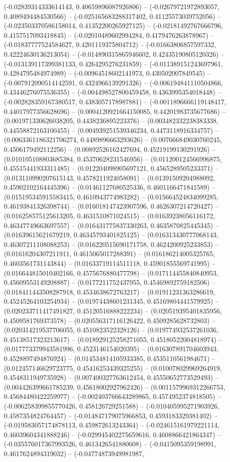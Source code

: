 (-0.02839314333614143, 0.40659896087926806) -- (-0.02679721972893057, 0.4089494484530566) -- (-0.025165683288317402, 0.41125573039752056) -- (-0.023503370586158014, 0.41352200265927125) -- (-0.02181492767666796, 0.4157517093418845) -- (-0.02010489602994284, 0.4179476263878967) -- (-0.01837777524584627, 0.4201119375804712) -- (-0.01663806857597332, 0.42224630136213054) -- (-0.014890315865946602, 0.42435190805120326) -- (-0.013139117399381133, 0.4264295276231859) -- (-0.011389151243697961, 0.4284795484974989) -- (-0.00964518602141973, 0.430502007849545) -- (-0.007912090514142591, 0.4324966139291326) -- (-0.006194841110504866, 0.43446276075536355) -- (-0.004498527800459458, 0.4363995354018448) -- (-0.002828359167380517, 0.4383057178987881) -- (-0.0011896666119148417, 0.44017977356628696) -- (0.0004120921664150085, 0.44201983735677686) -- (0.001971330626038205, 0.4438236895223376) -- (0.003482332238383338, 0.44558872163100455) -- (0.004939251539346234, 0.4473118916334757) -- (0.0063361186321706274, 0.4489896663293626) -- (0.007666849030760245, 0.4506179492112256) -- (0.00892526162427694, 0.45219199130291926) -- (0.010105108803685384, 0.45370628231546956) -- (0.011200124566996875, 0.45515441933311485) -- (0.012204098905697121, 0.4565289505233371) -- (0.013110990207615143, 0.4578211924058091) -- (0.01391509204988092, 0.45902102164445396) -- (0.01461127680525336, 0.4601166471841589) -- (0.015195345915583415, 0.4610943774983282) -- (0.015664524834099285, 0.46193841326398744) -- (0.016018147423907596, 0.4626307214720427) -- (0.016258575125613205, 0.4631510871024515) -- (0.01639238056116172, 0.46347749663697557) -- (0.016431775837330263, 0.4635870825445345) -- (0.01639615621679219, 0.46345793401825125) -- (0.016313430777068143, 0.46307211108088253) -- (0.016220515690171758, 0.4624200925233853) -- (0.01616204307211911, 0.4615065017288391) -- (0.016186214005325765, 0.4603561731143844) -- (0.01633719114511118, 0.45901855569741995) -- (0.016644815010402166, 0.4575676880477798) -- (0.017114455840840953, 0.45609553149208887) -- (0.0177211752437955, 0.45469892759182506) -- (0.018411443508287918, 0.4534638672763217) -- (0.01911231363286619, 0.45245264103254934) -- (0.01974438601231345, 0.45169804441579925) -- (0.020233711417491827, 0.45120516888222234) -- (0.020519395401835956, 0.4509581769373578) -- (0.020556317116126422, 0.4509285628732803) -- (0.020314219537706055, 0.4510823522328126) -- (0.019774932537261036, 0.45138517323213617) -- (0.018929125258271055, 0.45180522004818974) -- (0.017773379943581996, 0.4523146154020395) -- (0.016307891704603943, 0.4528897494876924) -- (0.014534814105933385, 0.4535110561984671) -- (0.012457146629723775, 0.45416253439325255) -- (0.010078029969264919, 0.4548311949735928) -- (0.007400327763612454, 0.45550652773529493) -- (0.004426399661785239, 0.45618002927962426) -- (0.0011579969312266753, 0.45684480422259977) -- (-0.002403766643289865, 0.4574952374818505) -- (-0.006258399855770426, 0.458126729251588) -- (-0.010405995271903926, 0.4587354824764457) -- (-0.014847179075966853, 0.4593183329381402) -- (-0.019583057174878113, 0.459872613243364) -- (-0.024615161979221114, 0.46039604341888246) -- (-0.029945402275659616, 0.4608866421864347) -- (-0.035576017367993526, 0.4613426541880608) -- (-0.0415095359198991, 0.4617624894319032) -- (-0.04774873949981987, 